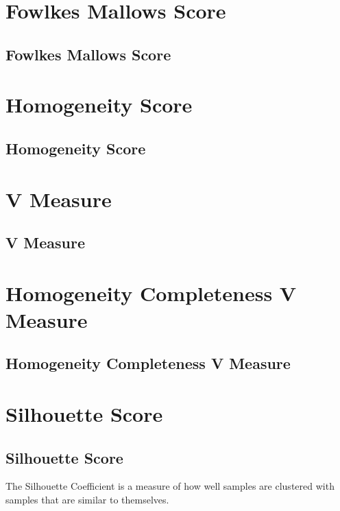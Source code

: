 \section{Fowlkes Mallows Score}
\subsection{Fowlkes Mallows Score}

\clearpage
\thispagestyle{clusteringstyle}
\section{Homogeneity Score}
\subsection{Homogeneity Score}

\clearpage
\thispagestyle{clusteringstyle}
\section{V Measure}
\subsection{V Measure}

\clearpage
\thispagestyle{clusteringstyle}
\section{Homogeneity Completeness V Measure}
\subsection{Homogeneity Completeness V Measure}

\clearpage
\thispagestyle{clusteringstyle}
\section{Silhouette Score}
\subsection{Silhouette Score}

The Silhouette Coefficient is a measure of how well samples are clustered with samples that are similar to themselves.

